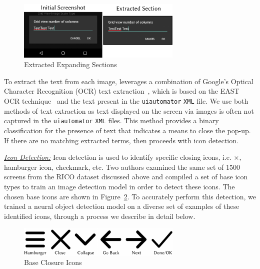 \begin{figure}[h]
    \centering
    \includegraphics[width=0.7\textwidth]{imgs/extracted-section.pdf}
    \caption{Extracted Expanding Sections}
    \label{extractedSec}
\end{figure}

To extract the text from each image, \MotorEase leverages a combination of Google's Optical Character Recognition (OCR) text extraction~\cite{ocr}, which is based on the EAST OCR technique~\cite{zhou2017east} and the text present in the \texttt{\small uiautomator} \texttt{\small XML} file. We use both methods of text extraction as text displayed on the screen via images is often not captured in the \texttt{\small uiautomator} \texttt{\small XML} files. This method provides a binary classification for the presence of text that indicates a means to close the pop-up. If there are no matching extracted terms, \MotorEase then proceeds with icon detection.


\noindent\emph{\underline{Icon Detection:}} Icon detection is used to identify specific closing icons, i.e. $\times$, hamburger icon, checkmark, etc. Two authors examined the same set of 1500 screens from the RICO dataset discussed above and compiled a set of base icon types to train an image detection model in order to detect these icons. The chosen base icons are shown in Figure~\ref{fig:icons}. To accurately perform this detection, we trained a neural object detection model on a diverse set of examples of these identified icons, through a process we describe in detail below. 

\begin{figure}[t]
    \centering
    \includegraphics[width=0.7\textwidth]{imgs/closure-icons.pdf}
    \caption{Base Closure Icons}
    \label{fig:icons}
\end{figure}

